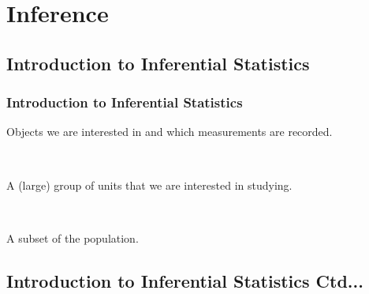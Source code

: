 \documentclass[xcolor=svgnames, compress]{beamer}
\begin{document}
\section{Inference}

\subsection*{Introduction to Inferential Statistics}

\begin{frame}
\frametitle{Introduction to Inferential Statistics} 

\vspace{-0.5cm}

\begin{definition}[Unit]
Objects we are interested in and which measurements are recorded.
\end{definition}

\hfill\\

\begin{definition}[Population]
A (large) group of units that we are interested in studying.
\end{definition}

\hfill\\

\begin{definition}[Sample]
A subset of the population.
\end{definition}



\end{frame}





\subsection*{Introduction to Inferential Statistics Ctd...}
\end{document}
